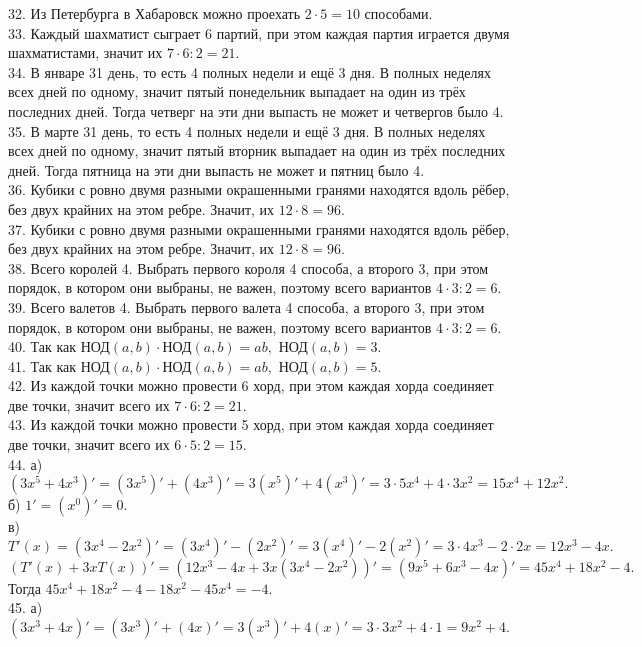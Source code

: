 32. Из Петербурга в Хабаровск можно проехать $2\cdot5=10$ способами.\\
33. Каждый шахматист сыграет 6 партий, при этом каждая партия играется двумя шахматистами, значит их $7\cdot6:2=21.$\\
34. В январе 31 день, то есть 4 полных недели и ещё 3 дня. В полных неделях всех дней по одному, значит пятый понедельник выпадает на один из трёх последних дней. Тогда четверг на эти дни выпасть не может и четвергов было 4.\\
35. В марте 31 день, то есть 4 полных недели и ещё 3 дня. В полных неделях всех дней по одному, значит пятый вторник выпадает на один из трёх последних дней. Тогда пятница на эти дни выпасть не может и пятниц было 4.\\
36. Кубики с ровно двумя разными окрашенными гранями находятся вдоль рёбер, без двух крайних на этом ребре. Значит, их $12\cdot8=96.$\\
37. Кубики с ровно двумя разными окрашенными гранями находятся вдоль рёбер, без двух крайних на этом ребре. Значит, их $12\cdot8=96.$\\
38. Всего королей 4. Выбрать первого короля 4 способа, а второго 3, при этом порядок, в котором они выбраны, не важен, поэтому всего вариантов $4\cdot3:2=6.$\\
39. Всего валетов 4. Выбрать первого валета 4 способа, а второго 3, при этом порядок, в котором они выбраны, не важен, поэтому всего вариантов $4\cdot3:2=6.$\\
40. Так как НОД$(a,b)\cdot$НОД$(a,b)=ab,$ НОД$(a,b)=3.$\\
41. Так как НОД$(a,b)\cdot$НОД$(a,b)=ab,$ НОД$(a,b)=5.$\\
42. Из каждой точки можно провести 6 хорд, при этом каждая хорда соединяет две точки, значит всего их $7\cdot6:2=21.$\\
43. Из каждой точки можно провести 5 хорд, при этом каждая хорда соединяет две точки, значит всего их $6\cdot5:2=15.$\\
44. а) $(3x^5+4x^3)'=(3x^5)'+(4x^3)'=3(x^5)'+4(x^3)'=3\cdot5x^4+4\cdot3x^2=15x^4+12x^2.$\\
б) $1'=(x^0)'=0.$\\
в) $T'(x)=(3x^4-2x^2)'=(3x^4)'-(2x^2)'=3(x^4)'-2(x^2)'=3\cdot4x^3-2\cdot2x=12x^3-4x.$\\
$(T'(x)+3xT(x))'=(12x^3-4x+3x(3x^4-2x^2))'=(9x^5+6x^3-4x)'=45x^4+18x^2-4.$ Тогда $45x^4+18x^2-4-18x^2-45x^4=-4.$\\
45. а) $(3x^3+4x)'=(3x^3)'+(4x)'=3(x^3)'+4(x)'=3\cdot3x^2+4\cdot 1=9x^2+4.$\\
